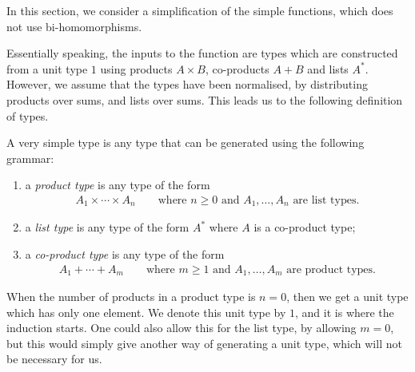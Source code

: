 In this section, we consider a simplification of the simple functions, which does not use bi-homomorphisms. 

Essentially speaking, the inputs to the function are types which are constructed from a unit type $1$ using products $ A \times B$, co-products $A + B$ and lists $A^*$. However, we assume that the types have been normalised, by distributing products over sums, and lists over sums. This leads us to the following definition of types. 

\begin{definition}
    A very simple type is any type that can be generated using the following grammar:
    \begin{enumerate}
        \item a \emph{product type} is any type of the form 
        \begin{align*}
        A_1 \times \cdots \times A_n \qquad \text{where $n \ge 0$ and  $A_1,\ldots,A_n$ are list types}.
        \end{align*}
        \item a \emph{list type} is any type of the form $A^*$ where $A$ is a co-product type;
        \item a \emph{co-product type} is any type of the form
        \begin{align*}A_1 + \cdots + A_m
            \qquad \text{where $m \ge 1$ and  $A_1,\ldots,A_m$ are product types}.
\end{align*}
    \end{enumerate}
\end{definition}


When the  number of products in a product type is $n=0$, then  we get a unit type which has only one element. We denote this unit type by $1$, and it is where the induction starts. One could also allow this for the list type, by allowing $m=0$, but this would simply give another way of generating a unit type, which will not be necessary for us.




